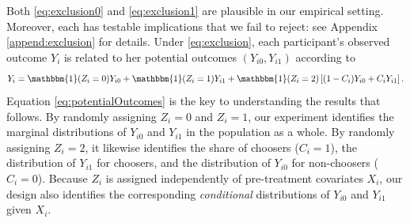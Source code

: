 \documentclass[oneside,11pt]{article}
\begin{document}
Both \eqref{eq:exclusion0} and \eqref{eq:exclusion1} are plausible in our empirical setting. 
Moreover, each has testable implications that we fail to reject: see Appendix \ref{append:exclusion} for details. Under \eqref{eq:exclusion}, each participant's observed outcome $Y_i$ is related to her potential outcomes $(Y_{i0}, Y_{i1})$ according to  
\begin{equation}
    Y_i = \mathbbm{1}(Z_i =0) Y_{i0} + \mathbbm{1}(Z_i = 1)  Y_{i1}  + \mathbbm{1}(Z_i = 2) \left[(1 - C_i) Y_{i0} + C_i Y_{i1} \right].
\label{eq:potentialOutcomes}
\end{equation}
%
Equation \ref{eq:potentialOutcomes} is the key to understanding the results that follows. 
By randomly assigning $Z_i=0$ and $Z_i = 1$, our experiment identifies the marginal distributions of $Y_{i0}$ and $Y_{i1}$ in the population as a whole. 
By randomly assigning $Z_i=2$, it likewise identifies the share of choosers ($C_i = 1$), the distribution of $Y_{i1}$ for choosers, and the distribution of $Y_{i0}$ for non-choosers ($C_i = 0$).
Because $Z_i$ is assigned independently of pre-treatment covariates $X_i$, our design also identifies the corresponding \emph{conditional} distributions of $Y_{i0}$ and $Y_{i1}$ given $X_i$. 



\end{document}
